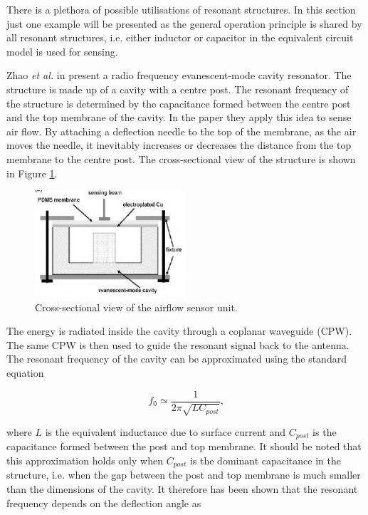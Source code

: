 \documentclass[11pt,a4paper]{article}
\begin{document}
There is a plethora of possible utilisations of resonant structures. In this section just one example will be presented as the general operation principle is shared by all resonant structures, i.e. either inductor or capacitor in the equivalent circuit model is used for sensing.

Zhao \textit{et al.} in \cite{evamode}  present a radio frequency evanescent-mode cavity resonator. The structure is made up of a cavity with a centre post. The resonant frequency of the structure is determined by the capacitance formed between the centre post and the top membrane of the cavity. In the paper they apply this idea to sense air flow. By attaching a deflection needle to the top of the membrane, as the air moves the needle, it inevitably increases or decreases the distance from the top membrane to the centre post. The cross-sectional view of the structure is shown in Figure \ref{fig:eva}.

\begin{figure}[h]
\centering
\includegraphics[width=0.5\textwidth]{cavity.JPG}
\caption{Cross-sectional view of the airflow sensor unit. \cite{evamode}\label{fig:eva}}
\end{figure}

The energy is radiated inside the cavity through a coplanar waveguide (CPW). The same CPW is then used to guide the resonant signal back to the antenna. The resonant frequency of the cavity can be approximated using the standard equation

\begin{equation}
f_0 \simeq \frac{1}{2\pi \sqrt{L C_{post}}}\textrm{,}
\end{equation}

where $L$ is the equivalent inductance due to surface current and $C_{post}$ is the capacitance formed between the post and top membrane. It should be noted that this approximation holds only when $C_{post}$  is the dominant capacitance in the structure, i.e. when the gap between the post and top membrane is much smaller than the dimensions of the cavity. It therefore  has been shown that the resonant frequency depends on the deflection angle as
\end{document}
